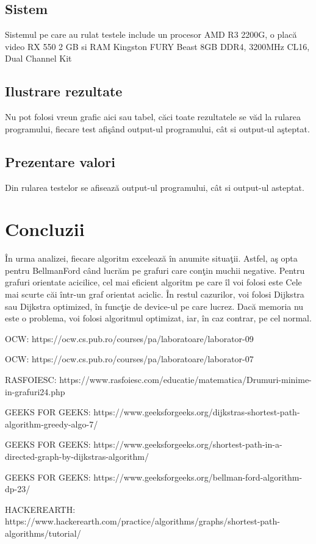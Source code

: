 \documentclass[runningheads]{llncs}
\begin{document}
\subsection{Sistem}
Sistemul pe care au rulat testele include un procesor AMD R3 2200G, o plac\u{a} video RX 550 2 GB si RAM Kingston FURY Beast 8GB DDR4, 3200MHz CL16, Dual Channel Kit

\subsection{Ilustrare rezultate}
Nu pot folosi vreun grafic aici sau tabel, c\u{a}ci toate rezultatele se v\u{a}d la rularea programului, fiecare test afi\c{s}\^{a}nd output-ul programului, c\^{a}t si output-ul a\c{s}teptat.

\subsection{Prezentare valori}
Din rularea testelor se afiseaz\u{a} output-ul programului, c\^{a}t si output-ul asteptat.

\section{Concluzii}
\^{I}n urma analizei, fiecare algoritm exceleaz\u{a} \^{i}n anumite situa\c{t}ii.
Astfel, a\c{s} opta pentru BellmanFord c\^{a}nd lucr\u{a}m pe grafuri care con\c{t}in muchii negative.
Pentru grafuri orientate acicilice, cel mai eficient algoritm pe care \^{i}l voi folosi este Cele mai scurte c\u{a}i \^{i}ntr-un graf orientat aciclic.
\^{I}n restul cazurilor, voi folosi Dijkstra sau Dijkstra optimized, \^{i}n func\c{t}ie de device-ul pe care lucrez. Dac\u{a} memoria nu este o problema, voi folosi algoritmul optimizat, iar, \^{i}n caz contrar, pe cel normal.

\newpage
\begin{thebibliography}{8}
OCW: https://ocw.cs.pub.ro/courses/pa/laboratoare/laborator-09

OCW: https://ocw.cs.pub.ro/courses/pa/laboratoare/laborator-07

RASFOIESC: https://www.rasfoiesc.com/educatie/matematica/Drumuri-minime-in-grafuri24.php

GEEKS FOR GEEKS: https://www.geeksforgeeks.org/dijkstras-shortest-path-algorithm-greedy-algo-7/

GEEKS FOR GEEKS: https://www.geeksforgeeks.org/shortest-path-in-a-directed-graph-by-dijkstras-algorithm/

GEEKS FOR GEEKS: https://www.geeksforgeeks.org/bellman-ford-algorithm-dp-23/

HACKEREARTH: https://www.hackerearth.com/practice/algorithms/graphs/shortest-path-algorithms/tutorial/
\end{thebibliography}
%
%
%
%
%
\end{document}
